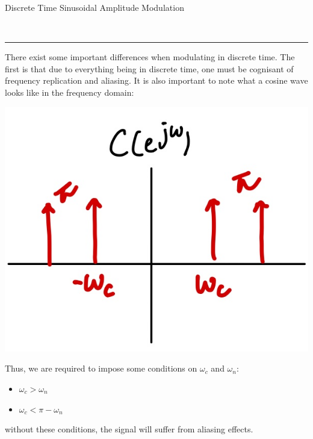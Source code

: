 \documentclass{article}
\newcommand{\header}[1]{\begin{large}\noindent #1\end{large}\\\rule{\textwidth}{0.5pt}}
\begin{document}
\header{Discrete Time Sinusoidal Amplitude Modulation}
There exist some important differences when modulating in discrete time. The first is that 
due to everything being in discrete time, one must be cognisant of frequency replication and 
aliasing. It is also important to note what a cosine wave looks like in the frequency 
domain:

\begin{center}
    \includegraphics[scale=0.2]{cosine-dt.jpg}
\end{center}

Thus, we are required to impose some conditions on $\omega_c$ and $\omega_n$:
\begin{itemize}
    \item $\omega_c > \omega_n$
    \item $\omega_c < \pi - \omega_n$
\end{itemize}
without these conditions, the signal will suffer from aliasing effects.

\pagebreak
\end{document}
